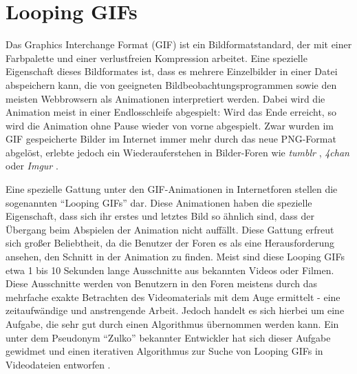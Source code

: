 \chapter{Looping GIFs}
Das Graphics Interchange Format (GIF) ist ein Bildformatstandard, der mit einer Farbpalette und einer verlustfreien Kompression arbeitet. Eine spezielle Eigenschaft dieses Bildformates ist, dass es mehrere Einzelbilder in einer Datei abspeichern kann, die von geeigneten Bildbeobachtungsprogrammen sowie den meisten Webbrowsern als Animationen interpretiert werden. Dabei wird die Animation meist in einer Endlosschleife abgespielt: Wird das Ende erreicht, so wird die Animation ohne Pause wieder von vorne abgespielt. Zwar wurden im GIF gespeicherte Bilder im Internet immer mehr durch das neue PNG-Format abgelöst, erlebte jedoch ein Wiederauferstehen in Bilder-Foren wie \textit{tumblr} \cite{Tumblr:1}, \textit{4chan} \cite{4chan:1} oder \textit{Imgur} \cite{Imgur:1}. 

Eine spezielle Gattung unter den GIF-Animationen in Internetforen stellen die sogenannten "`Looping GIFs"' dar. Diese Animationen haben die spezielle Eigenschaft, dass sich ihr erstes und letztes Bild so ähnlich sind, dass der Übergang beim Abspielen der Animation nicht auffällt. Diese Gattung erfreut sich großer Beliebtheit, da die Benutzer der Foren es als eine Herausforderung ansehen, den Schnitt in der Animation zu finden. Meist sind diese Looping GIFs etwa 1 bis 10 Sekunden lange Ausschnitte aus bekannten Videos oder Filmen. Diese Ausschnitte werden von Benutzern in den Foren meistens durch das mehrfache exakte Betrachten des Videomaterials mit dem Auge ermittelt - eine zeitaufwändige und anstrengende Arbeit. Jedoch handelt es sich hierbei um eine Aufgabe, die sehr gut durch einen Algorithmus übernommen werden kann. Ein unter dem Pseudonym "`Zulko"' \cite{Zulko:1} bekannter Entwickler hat sich dieser Aufgabe gewidmet und einen iterativen Algorithmus \cite{Goldberg:1} zur Suche von Looping GIFs in Videodateien entworfen \cite{Zulko:2}. 